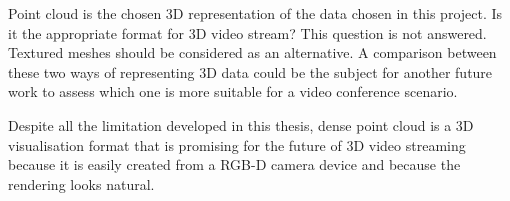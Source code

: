 Point cloud is the chosen 3D representation of the data chosen in this project. Is it the appropriate format for 3D video stream? This question is not answered. Textured meshes should be considered as an alternative. A comparison between these two ways of representing 3D data could be the subject for another future work to assess which one is more suitable for a video conference scenario.

Despite all the limitation developed in this thesis, dense point cloud is a 3D visualisation format that is promising for the future of 3D video streaming because it is easily created from a RGB-D camera device and because the rendering looks natural.